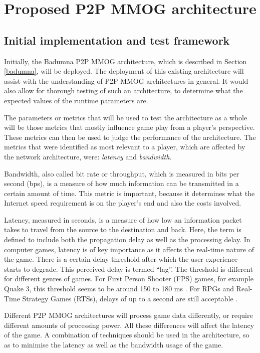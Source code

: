 \documentclass[journal,oneside,a4paper,onecolumn]{IEEEtran}
\begin{document}
\section{Proposed P2P MMOG architecture}
\label{proposed_architecture}

\subsection{Initial implementation and test framework}
Initially, the Badumna P2P MMOG architecture, which is described in Section \ref{badumna}, will be deployed. The deployment of this existing architecture will assist with the understanding of P2P MMOG architectures in general. It would also allow for thorough testing of such an architecture, to determine what the expected values of the runtime parameters are.

The parameters or metrics that will be used to test the architecture as a whole will be those metrics that mostly influence game play from a player's perspective. These metrics can then be used to judge the performance of the architecture. The metrics that were identified as most relevant to a player, which are affected by the network architecture, were: \emph{latency} and \emph{bandwidth}.

Bandwidth, also called bit rate or throughput, which is measured in bits per second (bps), is a measure of how much information can be transmitted in a certain amount of time. This metric is important, because it determines what the Internet speed requirement is on the player's end and also the costs involved.

Latency, measured in seconds, is a measure of how low an information packet takes to travel from the source to the destination and back. Here, the term is defined to include both the propagation delay as well as the processing delay. In computer games, latency is of key importance as it affects the real-time nature of the game. There is a certain delay threshold after which the user experience starts to degrade. This perceived delay is termed ``lag''. The threshold is different for different genres of games.  For First Person Shooter (FPS) games, for example Quake 3, this threshold seems to be around 150 to 180 ms \cite{quake3_delay_effect}. For RPGs and Real-Time Strategy Games (RTSs), delays of up to a second are still acceptable \cite{WoW_delay_effect}.

Different P2P MMOG architectures will process game data differently, or require different amounts of processing power. All these differences will affect the latency of the game. A combination of techniques should be used in the architecture, so as to minimise the latency as well as the bandwidth usage of the game.
\end{document}
